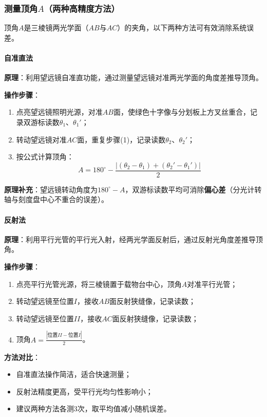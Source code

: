 \documentclass[11pt]{article}
\begin{document}
\subsubsection{测量顶角\(A\)（两种高精度方法）}
顶角\(A\)是三棱镜两光学面（\(AB\)与\(AC\)）的夹角，以下两种方法可有效消除系统误差。

\paragraph{自准直法}
\textbf{原理}：利用望远镜自准直功能，通过测量望远镜对准两光学面的角度差推导顶角。

\textbf{操作步骤}：
\begin{enumerate}[label=(\arabic*), itemsep=0.5ex]
    \item 点亮望远镜照明光源，对准\(AB\)面，使绿色十字像与分划板上方叉丝重合，记录双游标读数\(\theta_1\)、\(\theta_1'\)；
    \item 转动望远镜对准\(AC\)面，重复步骤(1)，记录读数\(\theta_2\)、\(\theta_2'\)；
    \item 按公式计算顶角：
\[
A = 180^\circ - \frac{|\left(\theta_2 - \theta_1\right) + \left(\theta_2' - \theta_1'\right)|}{2}
\]
\end{enumerate}

\textbf{原理补充}：望远镜转动角度为\(180^\circ - A\)，双游标读数平均可消除\textbf{偏心差}（分光计转轴与刻度盘中心不重合的误差）。

\paragraph{反射法}
\textbf{原理}：利用平行光管的平行光入射，经两光学面反射后，通过反射光角度差推导顶角。

\textbf{操作步骤}：
\begin{enumerate}[label=(\arabic*), itemsep=0.5ex]
    \item 点亮平行光管光源，将三棱镜置于载物台中心，顶角\(A\)对准平行光管；
    \item 转动望远镜至位置\(I\)，接收\(AB\)面反射狭缝像，记录读数；
    \item 转动望远镜至位置\(II\)，接收\(AC\)面反射狭缝像，记录读数；
    \item 顶角\(A = \frac{|\text{位置}II - \text{位置}I|}{2}\)。
\end{enumerate}

\textbf{方法对比}：
\begin{itemize}
    \item 自准直法操作简洁，适合快速测量；
    \item 反射法精度更高，受平行光均匀性影响小；
    \item 建议两种方法各测3次，取平均值减小随机误差。
\end{itemize}
\end{document}
